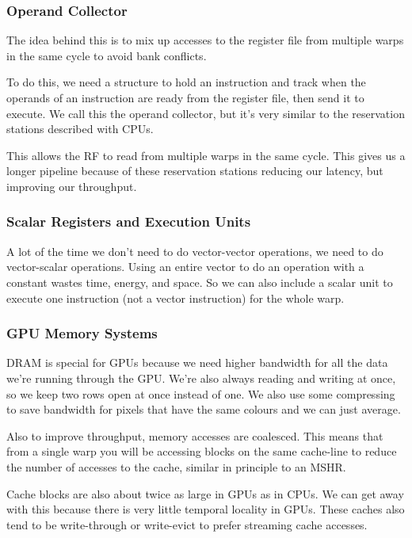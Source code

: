 \documentclass{article}
\begin{document}
\subsubsection{Operand Collector}

The idea behind this is to mix up accesses to the register file from multiple warps in the same cycle to avoid bank conflicts.

To do this, we need a structure to hold an instruction and track when the operands of an instruction are ready from the register file, then send it to execute. We call this the operand collector, but it's very similar to the reservation stations described with CPUs. 

This allows the RF to read from multiple warps in the same cycle. This gives us a longer pipeline because of these reservation stations reducing our latency, but improving our throughput. 

\subsubsection{Scalar Registers and Execution Units}

A lot of the time we don't need to do vector-vector operations, we need to do vector-scalar operations. Using an entire vector to do an operation with a constant wastes time, energy, and space. So we can also include a scalar unit to execute one instruction (not a vector instruction) for the whole warp.  

\subsubsection{GPU Memory Systems}

DRAM is special for GPUs because we need higher bandwidth for all the data we're running through the GPU. We're also always reading and writing at once, so we keep two rows open at once instead of one. We also use some compressing to save bandwidth for pixels that have the same colours and we can just average.

Also to improve throughput, memory accesses are coalesced. This means that from a single warp you will be accessing blocks on the same cache-line to reduce the number of accesses to the cache, similar in principle to an MSHR. 

Cache blocks are also about twice as large in GPUs as in CPUs. We can get away with this because there is very little temporal locality in GPUs. These caches also tend to be write-through or write-evict to prefer streaming cache accesses. 
\end{document}
